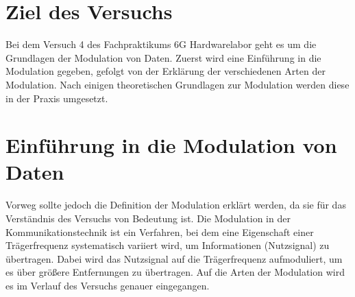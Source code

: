 
    \section{Ziel des Versuchs}
    Bei dem Versuch 4 des Fachpraktikums 6G Hardwarelabor geht es um die Grundlagen der Modulation von Daten. 
    Zuerst wird eine Einführung in die Modulation gegeben, gefolgt von der Erklärung der verschiedenen Arten der Modulation. Nach einigen theoretischen Grundlagen zur Modulation werden diese in der Praxis umgesetzt.
    \section{Einführung in die Modulation von Daten}
    Vorweg sollte jedoch die Definition der Modulation erklärt werden, da sie für das Verständnis des Versuchs von Bedeutung ist.
    Die Modulation in der Kommunikationstechnik ist ein Verfahren, bei dem eine Eigenschaft einer Trägerfrequenz systematisch variiert wird, um Informationen (Nutzsignal) zu übertragen.
    Dabei wird das Nutzsignal auf die Trägerfrequenz aufmoduliert, um es über größere Entfernungen zu übertragen.
    Auf die Arten der Modulation wird es im Verlauf des Versuchs genauer eingegangen.
\clearpage